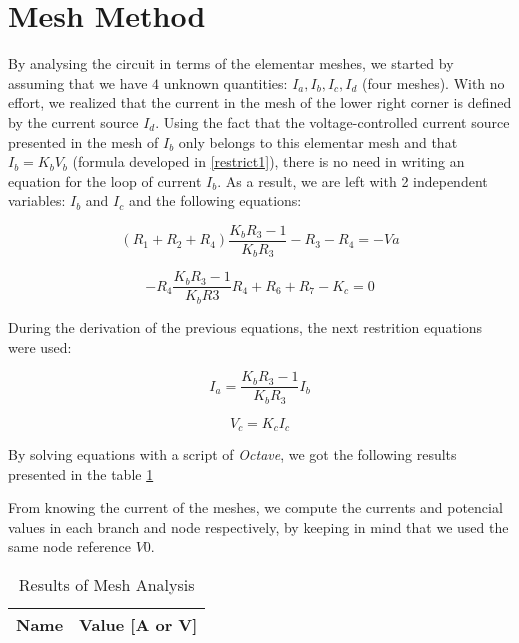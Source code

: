 \section{Mesh Method}

By analysing the circuit in terms of the elementar meshes, we started by assuming that we have $4$ unknown quantities: $I_a, I_b, I_c, I_d$ (four meshes).
With no effort, we realized that the current in the mesh of the lower right corner is defined by the current source $I_d$.
Using the fact that the voltage-controlled current source presented in the mesh of $I_b$ only belongs to this elementar mesh and that $I_b = K_b V_b$ (formula developed in \ref{restrict1}), there is no need in writing an equation for the loop of current $I_b$.
As a result, we are left with 2 independent variables: $I_b$ and $I_c$ and the following equations:


\begin{equation}
  (R_1 + R_2 + R_4) \frac{K_b R_3 -1}{K_b R_3}  - R_3  - R_4 = -Va
  \label{mesh1}
\end{equation}

\begin{equation}
  -R_4 \frac{K_b R_3 - 1}{K_b R3} R_4 + R_6 + R_7 - K_c = 0
  \label{mesh2}
\end{equation}

During the derivation of the previous equations, the next restrition equations were used:

\begin{equation}
  I_a = \frac{K_b R_3 -1}{K_b R_3} I_b
  \label{restrict1}
\end{equation}

\begin{equation}
  V_c = K_c I_c
  \label{restrict2}
\end{equation}

By solving equations with a script of \textit{Octave}, we got the following results presented in the table \ref{tab:op_octave}

From knowing the current of the meshes, we compute the currents and  potencial values in each branch and node respectively, by keeping in mind that we used the same node reference $V0$.


\begin{table}[h]
  \centering
  \begin{tabular}{|l|r|}
    \hline
    {\bf Name} & {\bf Value [A or V]} \\ \hline
    
  \end{tabular}
  \caption{Results of Mesh Analysis}
  \label{tab:op_octave}
\end{table}




